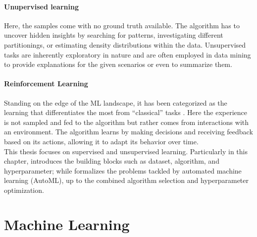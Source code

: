 \documentclass[a4paper,12pt,times,numbered,print,index]{Classes/PhDThesisPSnPDF}
\begin{document}
\paragraph{Unupervised learning} Here, the samples come with no ground truth available.
The algorithm has to uncover hidden insights by searching for patterns, investigating different partitionings, or estimating density distributions within the data.
Unsupervised tasks are inherently exploratory in nature and are often employed in data mining to provide explanations for the given scenarios or even to summarize them.

\paragraph{Reinforcement Learning} Standing on the edge of the ML landscape, it has been categorized as the learning that differentiates the most from ``classical'' tasks \cite{sutton2018reinforcement}.
Here the experience is not sampled and fed to the algorithm but rather comes from interactions with an environment.
The algorithm learns by making decisions and receiving feedback based on its actions, allowing it to adapt its behavior over time.\\

This thesis focuses on supervised and unsupervised learning.
Particularly in this chapter,  introduces the building blocks such as dataset, algorithm, and hyperparameter; while
 formalizes the problems tackled by automated machine learning (AutoML), up to the combined algorithm selection and hyperparameter optimization.

\section{Machine Learning}\label{automl-background-sec:ml}
\end{document}
